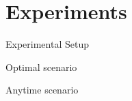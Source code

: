 \section*{Experiments}

\begin{frame}{Experimental Setup}
\end{frame}

\begin{frame}{Optimal scenario}
\end{frame}

\begin{frame}{Anytime scenario}
\end{frame}